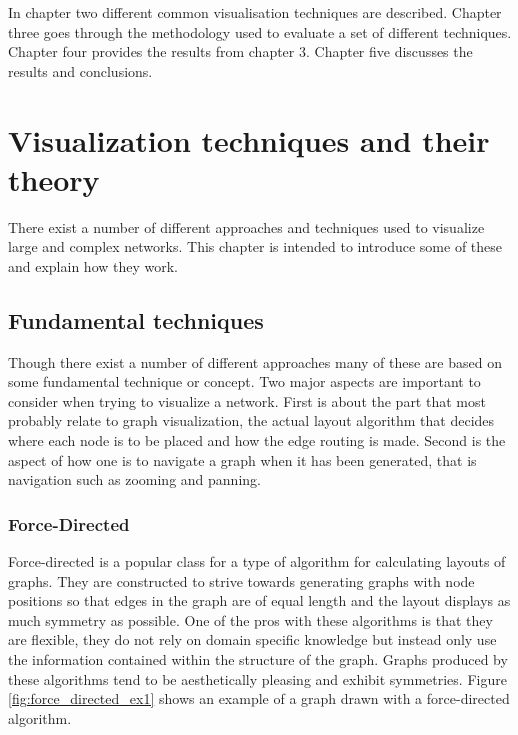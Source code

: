 \documentclass[a4paper,11pt]{kth-mag}
\begin{document}
In chapter two different common visualisation techniques are described. Chapter three goes through the methodology used to evaluate a set of different techniques. Chapter four provides the results from chapter 3. Chapter five discusses
the results and conclusions.
\chapter{Visualization techniques and their theory}
\label{Theory}
There exist a number of different approaches and techniques used to visualize large and complex networks. This chapter is intended to introduce some of these and explain how they work.
\section{Fundamental techniques}
Though there exist a number of different approaches many of these are based on some fundamental technique or concept. Two major aspects are important to consider when trying to visualize a network. First is about the part that
most probably relate to graph visualization, the actual layout algorithm that decides where each node is to be placed and how the edge routing is made. Second is the aspect of how one is to navigate a graph when it has been
generated, that is navigation such as zooming and panning.
\subsection{Force-Directed}
Force-directed is a popular class for a type of algorithm for calculating layouts of graphs. They are constructed to strive towards generating graphs with node positions so that edges in the graph are of equal length and the layout
displays as much symmetry as possible. One of the pros with these algorithms is that they are flexible, they do not rely on domain specific knowledge but instead only use the information contained within the structure of the graph. Graphs produced
by these algorithms tend to be aesthetically pleasing and exhibit symmetries\cite{1338}. Figure \ref{fig:force_directed_ex1} shows an example of a graph drawn with a force-directed algorithm.
\end{document}
